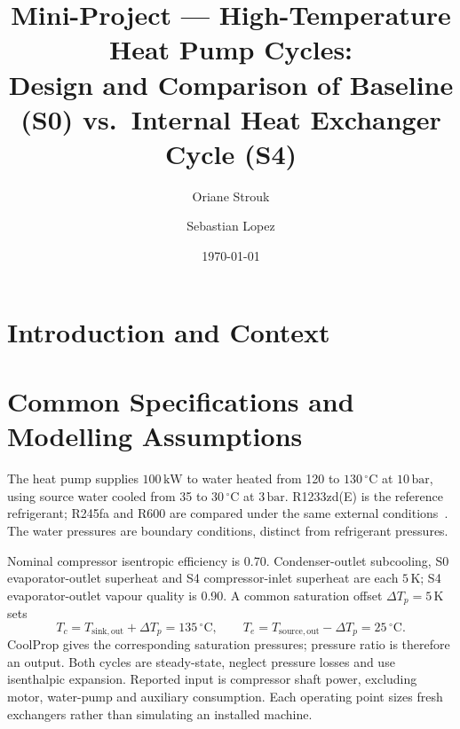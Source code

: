 \documentclass[11pt,a4paper]{article}
\title{\textbf{Mini-Project --- High-Temperature Heat Pump Cycles:}\\[0.3em]
\Large Design and Comparison of Baseline (S0) vs.\ Internal Heat Exchanger Cycle (S4)}
\author{Oriane Strouk \and Sebastian Lopez}
\date{\today}
\begin{document}
\maketitle

\begin{abstract}
\end{abstract}

\section{Introduction and Context}

\section{Common Specifications and Modelling Assumptions}
\label{sec:assumptions}
The heat pump supplies $100\,\mathrm{kW}$ to water heated from 120 to
$130\,{}^\circ\mathrm{C}$ at $10\,\mathrm{bar}$, using source water cooled
from 35 to $30\,{}^\circ\mathrm{C}$ at $3\,\mathrm{bar}$.
R1233zd(E) is the reference refrigerant; R245fa and R600 are compared under
the same external conditions~\cite{assignment}. The water pressures are
boundary conditions, distinct from refrigerant pressures.

Nominal compressor isentropic efficiency is 0.70. Condenser-outlet
subcooling, S0 evaporator-outlet superheat and S4 compressor-inlet superheat
are each $5\,\mathrm{K}$; S4 evaporator-outlet vapour quality is 0.90.
A common saturation offset $\Delta T_p=5\,\mathrm{K}$ sets
\begin{equation}
 T_c=T_{\mathrm{sink,out}}+\Delta T_p=135\,{}^\circ\mathrm{C},\qquad
 T_e=T_{\mathrm{source,out}}-\Delta T_p=25\,{}^\circ\mathrm{C}.
 \label{eq:saturation}
\end{equation}
CoolProp gives the corresponding saturation pressures; pressure ratio is
therefore an output. Both cycles are steady-state, neglect pressure losses
and use isenthalpic expansion. Reported input is compressor shaft power,
excluding motor, water-pump and auxiliary consumption. Each operating point
sizes fresh exchangers rather than simulating an installed machine.
\end{document}
